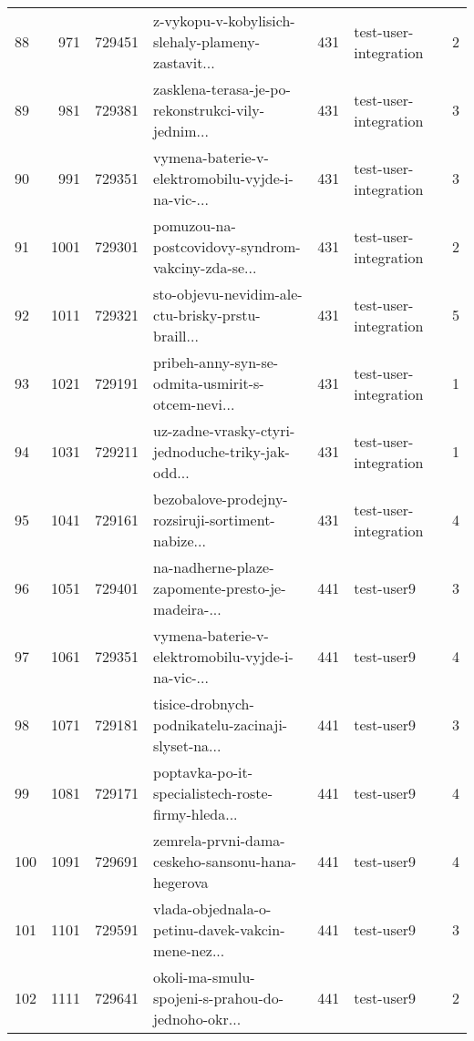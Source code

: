\begin{tabular}{lrrlrlr}
88   &        971 &   729451 &  z-vykopu-v-kobylisich-slehaly-plameny-zastavit... &      431 &        test-user-integration &               2 \\
89   &        981 &   729381 &  zasklena-terasa-je-po-rekonstrukci-vily-jednim... &      431 &        test-user-integration &               3 \\
90   &        991 &   729351 &  vymena-baterie-v-elektromobilu-vyjde-i-na-vic-... &      431 &        test-user-integration &               3 \\
91   &       1001 &   729301 &  pomuzou-na-postcovidovy-syndrom-vakciny-zda-se... &      431 &        test-user-integration &               2 \\
92   &       1011 &   729321 &  sto-objevu-nevidim-ale-ctu-brisky-prstu-braill... &      431 &        test-user-integration &               5 \\
93   &       1021 &   729191 &  pribeh-anny-syn-se-odmita-usmirit-s-otcem-nevi... &      431 &        test-user-integration &               1 \\
94   &       1031 &   729211 &  uz-zadne-vrasky-ctyri-jednoduche-triky-jak-odd... &      431 &        test-user-integration &               1 \\
95   &       1041 &   729161 &  bezobalove-prodejny-rozsiruji-sortiment-nabize... &      431 &        test-user-integration &               4 \\
96   &       1051 &   729401 &  na-nadherne-plaze-zapomente-presto-je-madeira-... &      441 &                   test-user9 &               3 \\
97   &       1061 &   729351 &  vymena-baterie-v-elektromobilu-vyjde-i-na-vic-... &      441 &                   test-user9 &               4 \\
98   &       1071 &   729181 &  tisice-drobnych-podnikatelu-zacinaji-slyset-na... &      441 &                   test-user9 &               3 \\
99   &       1081 &   729171 &  poptavka-po-it-specialistech-roste-firmy-hleda... &      441 &                   test-user9 &               4 \\
100  &       1091 &   729691 &   zemrela-prvni-dama-ceskeho-sansonu-hana-hegerova &      441 &                   test-user9 &               4 \\
101  &       1101 &   729591 &  vlada-objednala-o-petinu-davek-vakcin-mene-nez... &      441 &                   test-user9 &               3 \\
102  &       1111 &   729641 &  okoli-ma-smulu-spojeni-s-prahou-do-jednoho-okr... &      441 &                   test-user9 &               2 \\

\end{tabular}
